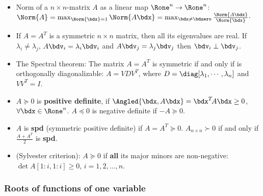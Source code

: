 \documentclass[a4paper]{article}
\begin{document}
\begin{itemize}

  \item Norm of a $n\times n$-matrix $A$ as a linear map $\Rone^n\to\Rone^n$:
    $\Norm{A}
    =\max_{\Norm{\bdx}=1} \Norm{A\bdx}
    =\max_{\bdx\neq\bdzero} \frac{\Norm{A\bdx}}{\Norm{\bdx}}\cdot
    $

  \item If $A=A^T$ is a symmetric $n\times n$ matrix,
    then all its eigenvalues are real.
    If
    $\lambda_i\neq \lambda_j$,
    $A\bdv_i=\lambda_i\bdv_i$
    and
    $A\bdv_j=\lambda_j\bdv_j$
    then
    $\bdv_i\perp\bdv_j$.
  \item
    The Spectral theorem: The matrix $A=A^T$ is symmetric
    if and only if is orthogonally diagonalizable:
    $A=VDV^T$,
    where
    $D=\diag[\lambda_1,\cdots,\lambda_n]$
    and
    $VV^T=I$.

  \item
    $A\succeq0$ is
    \textbf{positive definite}, if
    $\Angled{\bdx,A\bdx}=\bdx^T\!A\bdx\ge0$, $\forall\bdx\in\Rone^n$.
    $A\preceq0$ is negative definite if $-A\succeq0$.

  \item $A$ is \textbf{spd} (symmetric positive definite) if $A=A^T\succeq0$.
    $A_{n\times n}\succ 0$ if and only if \/ $\frac{A+A^T}{2}$ \/ is \textbf{spd}.

  \item (Sylvester criterion): $A\succeq 0$ if \textbf{all} its major minors are non-negative:
    $\det A[1:i,1:i]\ge 0$, $i=1,2,\ldots,n$.

\end{itemize}%

\subsubsection*{Roots of functions of one variable}%
\end{document}
